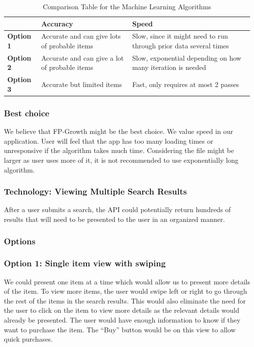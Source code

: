 \documentclass[journal,compsoc, 10pt, draftclsnofoot, onecolumn]{IEEEtran}
\begin{document}
\begin{table}[h]
	\centering
	\caption{Comparison Table for the Machine Learning Algorithms}
	\label{Comparison Table for the Machine Learning Algorithms}
	\begin{tabularx}{\textwidth}{|X|X|X|}
		\hline
		\textbf{}         & \textbf{Accuracy}                & \textbf{Speed} 
		\\ \hline
\textbf{Option 1} & Accurate and can give lots of probable items & Slow, since it
might need to run through prior data several times
		\\ \hline
\textbf{Option 2} & Accurate and can give a lot of probable items & Slow, exponential
depending on how many iteration is needed
		\\ \hline
\textbf{Option 3} & Accurate but limited items & Fast, only requires at most 2 passes\\ \hline
	\end{tabularx}
\end{table}

\subsubsection*{Best choice}
We believe that FP-Growth might be the best choice. We value speed in our
application. User will feel that the app has too many loading times or unresponsive
if the algorithm takes much time. Considering the file might be larger as user uses
more of it, it is not recommended to use exponentially long algorithm.

\subsubsection{Technology: Viewing Multiple Search Results}
After a user submits a search, the API could potentially return hundreds of results
that will need to be presented to the user in an organized manner.

\subsubsection*{Options}
\subsubsection*{Option 1: Single item view with swiping}
We could present one item at a time which would allow us to present more details of
the item. To view more items, the user would swipe left or right to go through the 
rest of the items in the search results. This would also eliminate the need for the 
user to click on the item to view more details as the relevant details would already 
be presented. The user would have enough information to know if they want to 
purchase the item. The ``Buy'' button would be on this view to allow quick purchases. 
\end{document}
